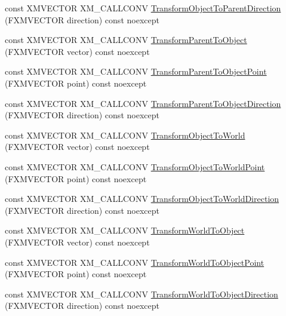 \begin{DoxyCompactItemize}
\item 
const X\+M\+V\+E\+C\+T\+OR X\+M\+\_\+\+C\+A\+L\+L\+C\+O\+NV \mbox{\hyperlink{classmage_1_1_transform_afddbd41527257bf0ed20ceafa19b49c9}{Transform\+Object\+To\+Parent\+Direction}} (F\+X\+M\+V\+E\+C\+T\+OR direction) const noexcept
\item 
const X\+M\+V\+E\+C\+T\+OR X\+M\+\_\+\+C\+A\+L\+L\+C\+O\+NV \mbox{\hyperlink{classmage_1_1_transform_a305841f6bbc0a4eadaacbce2918b438c}{Transform\+Parent\+To\+Object}} (F\+X\+M\+V\+E\+C\+T\+OR vector) const noexcept
\item 
const X\+M\+V\+E\+C\+T\+OR X\+M\+\_\+\+C\+A\+L\+L\+C\+O\+NV \mbox{\hyperlink{classmage_1_1_transform_a4b420feb6f839d045a0239056b47772d}{Transform\+Parent\+To\+Object\+Point}} (F\+X\+M\+V\+E\+C\+T\+OR point) const noexcept
\item 
const X\+M\+V\+E\+C\+T\+OR X\+M\+\_\+\+C\+A\+L\+L\+C\+O\+NV \mbox{\hyperlink{classmage_1_1_transform_a0f84d13bf0016a6c98d84ccf0d357b50}{Transform\+Parent\+To\+Object\+Direction}} (F\+X\+M\+V\+E\+C\+T\+OR direction) const noexcept
\item 
const X\+M\+V\+E\+C\+T\+OR X\+M\+\_\+\+C\+A\+L\+L\+C\+O\+NV \mbox{\hyperlink{classmage_1_1_transform_a9d560741131cf68503e725346d681991}{Transform\+Object\+To\+World}} (F\+X\+M\+V\+E\+C\+T\+OR vector) const noexcept
\item 
const X\+M\+V\+E\+C\+T\+OR X\+M\+\_\+\+C\+A\+L\+L\+C\+O\+NV \mbox{\hyperlink{classmage_1_1_transform_ae6a1911525810251aeb563b296f354d6}{Transform\+Object\+To\+World\+Point}} (F\+X\+M\+V\+E\+C\+T\+OR point) const noexcept
\item 
const X\+M\+V\+E\+C\+T\+OR X\+M\+\_\+\+C\+A\+L\+L\+C\+O\+NV \mbox{\hyperlink{classmage_1_1_transform_ae2bd913d2092e4f41cf65072b49df4d7}{Transform\+Object\+To\+World\+Direction}} (F\+X\+M\+V\+E\+C\+T\+OR direction) const noexcept
\item 
const X\+M\+V\+E\+C\+T\+OR X\+M\+\_\+\+C\+A\+L\+L\+C\+O\+NV \mbox{\hyperlink{classmage_1_1_transform_adc0ce8b6fa55d289b5354d21b3e96486}{Transform\+World\+To\+Object}} (F\+X\+M\+V\+E\+C\+T\+OR vector) const noexcept
\item 
const X\+M\+V\+E\+C\+T\+OR X\+M\+\_\+\+C\+A\+L\+L\+C\+O\+NV \mbox{\hyperlink{classmage_1_1_transform_af4d6c69cbf207632ded7c33446c5ee91}{Transform\+World\+To\+Object\+Point}} (F\+X\+M\+V\+E\+C\+T\+OR point) const noexcept
\item 
const X\+M\+V\+E\+C\+T\+OR X\+M\+\_\+\+C\+A\+L\+L\+C\+O\+NV \mbox{\hyperlink{classmage_1_1_transform_a5f7294e796fa370e44c6ca055638ffde}{Transform\+World\+To\+Object\+Direction}} (F\+X\+M\+V\+E\+C\+T\+OR direction) const noexcept

\end{DoxyCompactItemize}

